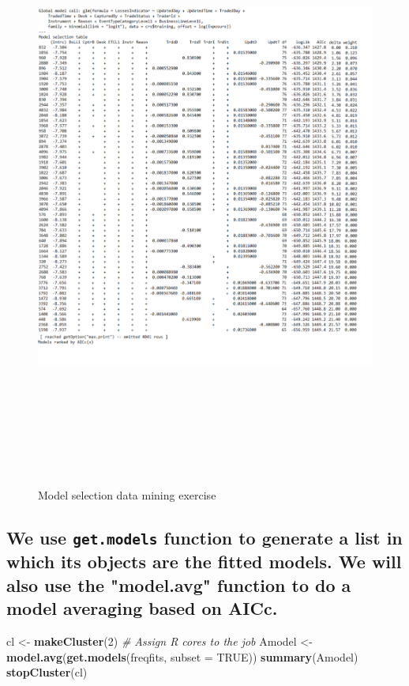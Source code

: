 \documentclass[
]{article}
\newenvironment{Shaded}{\begin{snugshade}}{\end{snugshade}}
\newcommand{\CommentTok}[1]{\textcolor[rgb]{0.56,0.35,0.01}{\textit{#1}}}
\newcommand{\DataTypeTok}[1]{\textcolor[rgb]{0.13,0.29,0.53}{#1}}
\newcommand{\DecValTok}[1]{\textcolor[rgb]{0.00,0.00,0.81}{#1}}
\newcommand{\KeywordTok}[1]{\textcolor[rgb]{0.13,0.29,0.53}{\textbf{#1}}}
\newcommand{\NormalTok}[1]{#1}
\newcommand{\OtherTok}[1]{\textcolor[rgb]{0.56,0.35,0.01}{#1}}
\newcommand{\StringTok}[1]{\textcolor[rgb]{0.31,0.60,0.02}{#1}}
\begin{document}
\begin{figure}
\centering
\includegraphics[height=20cm, width=15cm]{Dredge_bin.pdf}
\caption[Data dredging]{Model selection data mining exercise}
\label{Dredge}
\end{figure}

\subsection{We use \texttt{get.models} function to generate a list in which its objects are the fitted models. We will also use the "model.avg" function to do a model averaging based on AICc.}
\label{sec:Model averaging function}

\small

\begin{Shaded}
\begin{Highlighting}[]
\NormalTok{cl <-}\StringTok{ }\KeywordTok{makeCluster}\NormalTok{(}\DecValTok{2}\NormalTok{) }\CommentTok{# Assign R cores to the job }
\NormalTok{Amodel <-}\StringTok{ }\KeywordTok{model.avg}\NormalTok{(}\KeywordTok{get.models}\NormalTok{(freqfits, }\DataTypeTok{subset =} \OtherTok{TRUE}\NormalTok{))}
\KeywordTok{summary}\NormalTok{(Amodel)}
\KeywordTok{stopCluster}\NormalTok{(cl) }
\end{Highlighting}
\end{Shaded}
\end{document}
